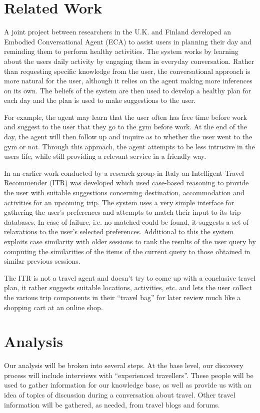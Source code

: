 \documentclass[11pt]{article} %
\begin{document}
\section{Related Work}
A joint project between researchers in the U.K. and Finland
developed an Embodied Conversational Agent (ECA) to assist
users in planning their day and reminding them to perform
healthy activities. The system works by learning about the
users daily activity by engaging them in everyday conversation.
Rather than requesting specific knowledge from the user, the
conversational approach is more natural for the user, although
it relies on the agent making more inferences on its own. The
beliefs of the system are then used to develop a healthy plan
for each day and the plan is used to make suggestions to the user.

For example, the agent may learn that the user often has free
time before work and suggest to the user that they go to the
gym before work. At the end of the day, the agent will then
follow up and inquire as to whether the user went to the gym
or not. Through this approach, the agent attempts to be less
intrusive in the users life, while still providing a relevant
service in a friendly way.

In an earlier work conducted by a research group in Italy an
Intelligent Travel Recommender (ITR) was developed which used
case-based reasoning to provide the user with suitable
suggestions concerning destination, accommodation and
activities for an upcoming trip. The system uses a very
simple interface for gathering the user’s preferences and
attempts to match their input to its trip databases. In case
of failure, i.e. no matched could be found, it suggests a set
of relaxations to the user’s selected preferences. Additional
to this the system exploits case similarity with older sessions
to rank the results of the user query by computing the
similarities of the items of the current query to those
obtained in similar previous sessions.

The ITR is not a travel agent and doesn’t try to come up
with a conclusive travel plan, it rather suggests suitable
locations, activities, etc. and lets the user collect the
various trip components in their ``travel bag'' for later
review much like a shopping cart at an online shop. 

\section{Analysis}
Our analysis will be broken into several steps. At the
base level, our discovery process will include interviews
with ``experienced travellers''. These people will be used
to gather information for our knowledge base, as well as
provide us with an idea of topics of discussion during a
conversation about travel. Other travel information will
be gathered, as needed, from travel blogs and forums.
\end{document}
